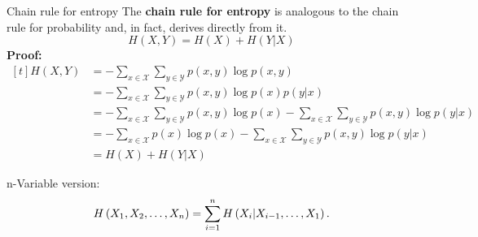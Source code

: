 \documentclass[11pt,compress,t,notes=noshow, xcolor=table]{beamer}
\begin{document}
\begin{vbframe} {Chain rule for entropy}
The \textbf{chain rule for entropy} is analogous to the chain rule for probability and, in fact, derives directly from it.
$$H(X, Y)=H(X)+H(Y | X)$$
\footnotesize
\textbf{Proof:}
$\begin{aligned}[t]
H(X, Y) &=-\sum_{x \in \mathcal{X}} \sum_{y \in \mathcal{Y}} p(x, y) \log p(x, y) \\
&=-\sum_{x \in \mathcal{X}} \sum_{y \in \mathcal{Y}} p(x, y) \log p(x) p(y | x) \\
&=-\sum_{x \in \mathcal{X}} \sum_{y \in \mathcal{Y}} p(x, y) \log p(x)-\sum_{x \in \mathcal{X}} \sum_{y \in \mathcal{Y}} p(x, y) \log p(y | x) \\
&=-\sum_{x \in \mathcal{X}} p(x) \log p(x)-\sum_{x \in \mathcal{X}} \sum_{y \in \mathcal{Y}} p(x, y) \log p(y | x) \\
&=H(X)+H(Y | X)
\end{aligned}
$
\normalsize

\lz

n-Variable version:
$$H\left(X_{1}, X_{2}, \ldots, X_{n}\right)=\sum\limits_{i=1}^n H\left(X_{i} | X_{i-1}, \ldots, X_{1}\right).$$





\end{vbframe}
\end{document}
